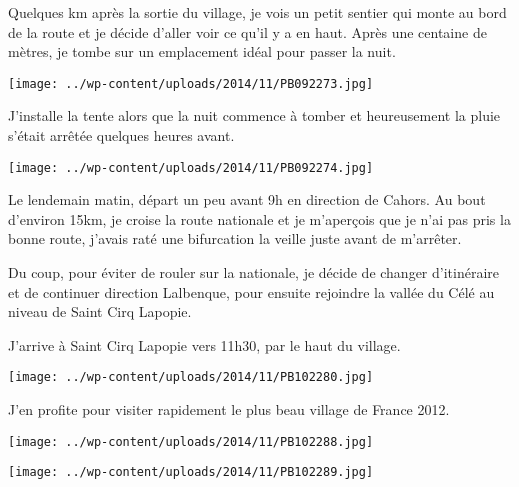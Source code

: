  Quelques km après la sortie du village, je vois un petit sentier qui monte au bord de la route et je décide d'aller voir ce qu'il y a en haut. Après une centaine de mètres, je tombe sur un emplacement idéal pour passer la nuit.

 

\begin{center} \texttt{[image: ../wp-content/uploads/2014/11/PB092273.jpg]} \end{center}



 J'installe la tente alors que la nuit commence à tomber et heureusement la pluie s'était arrêtée quelques heures avant.

 

\begin{center} \texttt{[image: ../wp-content/uploads/2014/11/PB092274.jpg]} \end{center}



 Le lendemain matin, départ un peu avant 9h en direction de Cahors. Au bout d'environ 15km, je croise la route nationale et je m'aperçois que je n'ai pas pris la bonne route, j'avais raté une bifurcation la veille juste avant de m'arrêter.

 Du coup, pour éviter de rouler sur la nationale, je décide de changer d'itinéraire et de continuer direction Lalbenque, pour ensuite rejoindre la vallée du Célé au niveau de Saint Cirq Lapopie.

 J'arrive à Saint Cirq Lapopie vers 11h30, par le haut du village.

 

\begin{center} \texttt{[image: ../wp-content/uploads/2014/11/PB102280.jpg]} \end{center}



 J'en profite pour visiter rapidement le plus beau village de France 2012.

 

\begin{center} \texttt{[image: ../wp-content/uploads/2014/11/PB102288.jpg]} \end{center}



 

\begin{center} \texttt{[image: ../wp-content/uploads/2014/11/PB102289.jpg]} \end{center}



